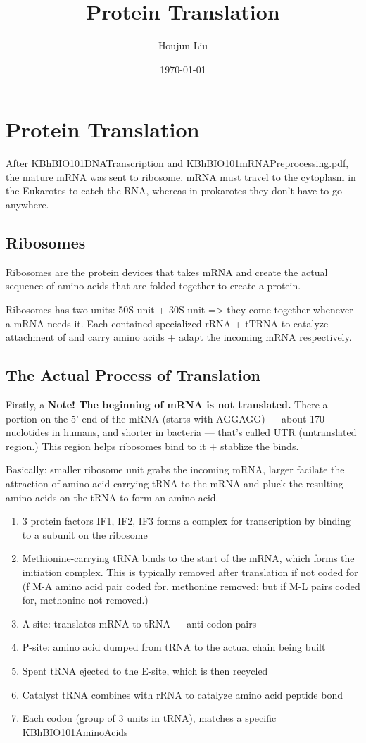 \documentclass[letterpaper]{article}
\author{Houjun Liu}
\date{\today}
\title{Protein Translation}
\renewcommand{\tableofcontents}{}
\begin{document}
\tableofcontents



\section{Protein Translation}
\label{sec:org8447b64}
After \href{KBhBIO101DNATranscription.org}{KBhBIO101DNATranscription}
and
\href{KBhBIO101mRNAPreprocessing.pdf.org}{KBhBIO101mRNAPreprocessing.pdf},
the mature mRNA was sent to ribosome. mRNA must travel to the cytoplasm
in the Eukarotes to catch the RNA, whereas in prokarotes they don't have
to go anywhere.

\subsection{Ribosomes}
\label{sec:orgca0c03a}
Ribosomes are the protein devices that takes mRNA and create the actual
sequence of amino acids that are folded together to create a protein.

Ribosomes has two units: 50S unit + 30S unit => they come together
whenever a mRNA needs it. Each contained specialized rRNA + tTRNA to
catalyze attachment of and carry amino acids + adapt the incoming mRNA
respectively.

\subsection{The Actual Process of Translation}
\label{sec:orgca055de}
Firstly, a \textbf{Note! The beginning of mRNA is not translated.} There a
portion on the 5' end of the mRNA (starts with AGGAGG) --- about 170
nuclotides in humans, and shorter in bacteria --- that's called UTR
(untranslated region.) This region helps ribosomes bind to it + stablize
the binds.

Basically: smaller ribosome unit grabs the incoming mRNA, larger
facilate the attraction of amino-acid carrying tRNA to the mRNA and
pluck the resulting amino acids on the tRNA to form an amino acid.

\begin{enumerate}
\item 3 protein factors IF1, IF2, IF3 forms a complex for transcription by
binding to a subunit on the ribosome
\item Methionine-carrying tRNA binds to the start of the mRNA, which forms
the initiation complex. This is typically removed after translation
if not coded for (f M-A amino acid pair coded for, methonine removed;
but if M-L pairs coded for, methonine not removed.)
\item A-site: translates mRNA to tRNA --- anti-codon pairs
\item P-site: amino acid dumped from tRNA to the actual chain being built
\item Spent tRNA ejected to the E-site, which is then recycled
\item Catalyst tRNA combines with rRNA to catalyze amino acid peptide bond
\item Each codon (group of 3 units in tRNA), matches a specific
\href{KBhBIO101AminoAcids.org}{KBhBIO101AminoAcids}
\end{enumerate}
\end{document}
